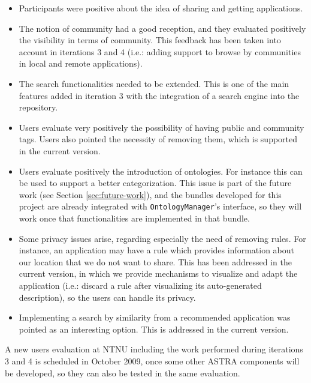 \begin{itemize}
  \item Participants were positive about the idea of sharing and 
 		getting applications.
  \item The notion of community had a good reception, and they evaluated
  positively the visibility in terms of community. This feedback has been taken
  into account in iterations 3 and 4 (i.e.: adding support to browse by
  communities in local and remote applications).
  \item The search functionalities needed to be extended. This is one of the
  main features added in iteration 3 with the integration of a search engine
  into the repository.
  \item Users evaluate very positively the possibility of having public and
  community tags. Users also pointed the necessity of removing them, which is
  supported in the current version.
  \item Users evaluate positively the introduction of ontologies. For instance
  this can be used to support a better categorization. This issue is part
  of the future work (see Section \ref{sec:future-work}), and the bundles
  developed for this project are already integrated with
  \verb|OntologyManager|'s interface, so they will work once that
  functionalities are implemented in that bundle.
  \item Some privacy issues arise, regarding especially the need of removing
  rules. For instance, an application may have a rule which provides
  information about our location that we do not want to share.
  This has been addressed in the current version, in which we provide mechanisms
  to visualize and adapt the application (i.e.: discard a rule after 
  visualizing its auto-generated description), so the users can handle its
  privacy.
  \item Implementing a search by similarity from a recommended application was
  pointed as an interesting option. This is addressed in the current version.
\end{itemize}

A new users evaluation at NTNU including the work performed during iterations 3
and 4 is scheduled in October 2009, once some other ASTRA components will be
developed, so they can also be tested in the same evaluation.
